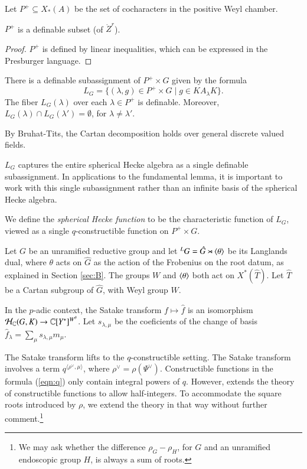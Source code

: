 Let $P^+\subseteq X_*(A)$ be the set of cocharacters in the positive
Weyl chamber.

\begin{lemma} 
  $P^+$ is a definable subset (of $\ring{Z}^r$).
\end{lemma}

\begin{proof} 
  $P^+$ is defined by linear inequalities, which can be expressed in
  the Presburger language.
\end{proof}

\begin{lemma} \label{lemma:cartan}
  There is a definable subassignment of $P^+\times G$ given by the
  formula
\[
L_G = \{(\lambda,g)\in P^+\times G \mid g \in K A_\lambda K \}.
\]
The fiber $L_G(\lambda)$ over each $\lambda\in P^+$ is definable.
Moreover, $L_G(\lambda)\cap L_G(\lambda') = \emptyset$, for
$\lambda\ne \lambda'$.
\end{lemma}

By Bruhat-Tits, the Cartan decomposition holds over general discrete valued
fields.

\begin{remark}   
  $L_G$ captures the entire spherical Hecke algebra as a single
  definable subassignment.  In applications to the fundamental lemma,
  it is important to work with this single subassignment rather than
  an infinite basis of the spherical Hecke algebra.
\end{remark}

We define the {\it spherical Hecke function} to be the characteristic
function of $L_G$, viewed as a single $q$-constructible function on
$P^+\times G$.

Let $G$ be an unramified reductive group and let ${}^LG = \hat
G\rtimes \langle{\theta}\rangle$ be its Langlands dual, where $\theta$ acts on
$\hat G$ as the action of the Frobenius on the root datum, as
explained in Section \ref{sec:B}.  The groups $W$ and $\langle{\theta}\rangle$
both act on $X^*(\hat T)$.  Let $\hat T$ be a Cartan subgroup of $\hat
G$, with Weyl group $W$.

In the $p$-adic context, the Satake transform $f\mapsto \hat f$ is an
isomorphism $\mathcal H_{\mathbb{C}}(G,K)\to\mathbb{C}[Y^*]^{W^\theta}$.  Let
$s_{\lambda,\mu}$ be the coeficients of the change of basis $\hat
f_\lambda = \sum_\mu s_{\lambda,\mu} m_\mu$.

The Satake transform lifts to the $q$-constructible setting.  The
Satake transform involves a term $q^{\langle\rho^\vee,\mu\rangle}$,
where $\rho^\vee = \rho(\Psi^\vee)$.  Constructible functions in the
formula (\ref{eqn:q}) only contain integral powers of $q$.  However,
\cite[\S B.3.1]{cluckers2011local} extends the theory of constructible
functions to allow half-integers.  To accommodate the square roots
introduced by $\rho$, we extend the theory in that way without further
comment.\footnote{We may ask whether the difference $\rho_G - \rho_H$,
  for $G$ and an unramified endoscopic group $H$, is always a sum of
  roots.}

